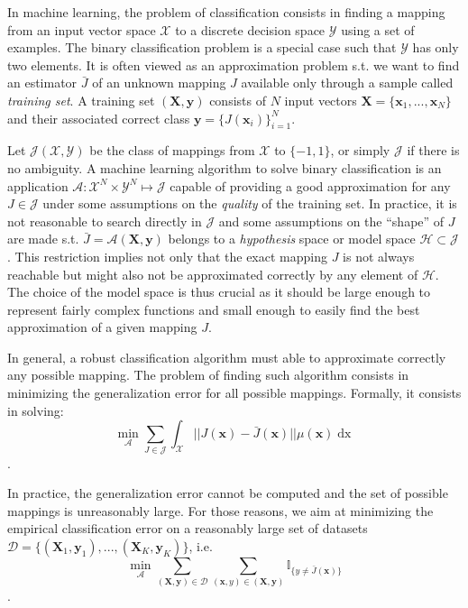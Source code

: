 \documentclass[preprint,12pt]{elsarticle}
\theoremstyle{definition}
\begin{document}
In machine learning, the problem of classification consists in finding a mapping from an input vector space $\mathcal X$ to a discrete decision space $\mathcal Y$ using a set of examples. The binary classification problem is a special case such that $\mathcal Y$ has only two elements. It is often viewed as an approximation problem s.t. we want to find an estimator $\bar J$ of an unknown mapping $J$ available only through a sample called {\it training set}. A training set $(\mathbf{X}, \mathbf{y})$ consists of $N$ input vectors $\mathbf{X} = \{ \mathbf{x}_1, ..., \mathbf{x}_N \}$ and their associated correct class $\mathbf{y} = \{ J(\mathbf{x}_i) \}^{N}_{i=1}$.

Let $\mathcal{J}(\mathcal X, \mathcal Y)$ be the class of mappings from $\mathcal X$ to $\{-1,1\}$, or simply $\mathcal{J}$ if there is no ambiguity. A machine learning algorithm to solve binary classification is an application $\mathcal A: \mathcal{X}^N \times \mathcal{Y}^N \mapsto \mathcal{J}$ capable of providing a good approximation for any $J \in \mathcal{J}$ under some assumptions on the {\it quality} of the training set. In practice, it is not reasonable to search directly in $\mathcal{J}$ and some assumptions on the ``shape'' of $J$ are made s.t. $\bar J = \mathcal{A}(\mathbf{X}, \mathbf{y})$ belongs to a {\it hypothesis} space or model space $\mathcal H \subset \mathcal{J}$. This restriction implies not only that the exact mapping $J$ is not always reachable but might also not be approximated correctly by any element of $\mathcal H$. The choice of the model space is thus crucial as it should be large enough to represent fairly complex functions and small enough to easily find the best approximation of a given mapping $J$.

In general, a robust classification algorithm must able to approximate correctly any possible mapping. The problem of finding such algorithm consists in minimizing the generalization error for all possible mappings. Formally, it consists in solving:
\begin{equation}
\label{eq:pb}
\underset{\mathcal A}{\min} \sum_{J \in \mathcal{J}} \int_{\mathcal{X}} ||J(\mathbf{x}) - \bar J(\mathbf{x}) ||\mu(\mathbf{x}) \mathop{dx}
\end{equation}.

In practice, the generalization error cannot be computed and the set of possible mappings is unreasonably large. For those reasons, we aim at minimizing the empirical classification error on a reasonably large set of datasets $\mathcal D =  \{ (\mathbf{X}_1, \mathbf{y}_1), ..., (\mathbf{X}_K, \mathbf{y}_K)  \}$, i.e.
\begin{equation}
\underset{\mathcal A}{\min} \sum_{(\mathbf{X}, \mathbf{y}) \in \mathcal D}  \sum_{ (\mathbf{x}, y) \in (\mathbf{X}, \mathbf{y})} \mathbb{I}_{\{y \neq \bar J(\mathbf{x})\}}
\end{equation}.
\end{document}
